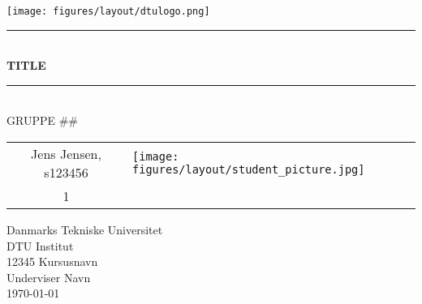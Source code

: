 \begin{titlepage}
\flushright\texttt{[image: figures/layout/dtulogo.png]}
\begin{center} \parindent=0pt
\newcommand{\HRule}{\rule{\textwidth}{1mm}}
\HRule\\[1cm]\Huge\bfseries
TITLE\\[0.7cm]
\HRule\\[1cm]
\large GRUPPE ##\\[0.7cm]
\begin{table}[H]
    \centering
    \begin{tabular}{c >{\centering\arraybackslash}m{}}
        \large Jens Jensen, s123456  &  \texttt{[image: figures/layout/student\_picture.jpg]}\\1
        \end{tabular}
\end{table}
 \normalsize %
\begin{flushleft}
Danmarks Tekniske Universitet\\
DTU Institut\\
12345 Kursusnavn \\
Underviser Navn \\
\today
\end{flushleft}
\end{center}
\end{titlepage}
